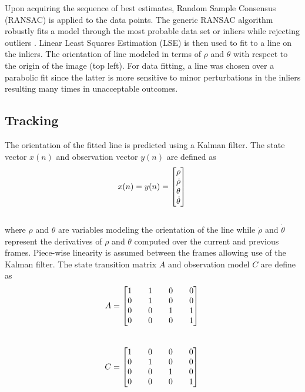 \documentclass{article}
\begin{document}
Upon acquiring the sequence of best estimates, Random Sample Consensus (RANSAC) is applied to the data points. The generic RANSAC algorithm robustly fits a model through the most probable data set or inliers while rejecting outliers \cite{hartley_multiple_2004,fischler_random_1981}. Linear Least Squares Estimation (LSE) is then used to fit to a line on the inliers. The orientation of line modeled in terms of $\rho$ and $\theta$ with respect to the origin of the image (top left). For data fitting, a line was chosen over a parabolic fit since the latter is more sensitive to minor perturbations in the inliers resulting many times in unacceptable outcomes.\\
\subsection{Tracking}
The orientation of the fitted line is predicted using a Kalman filter. The state vector $x(n)$ and observation vector $y(n)$ are defined as
\begin{equation}
x(n)= y(n)=\begin{bmatrix} \rho\\\dot{\rho}\\\theta\\\dot{\theta} \end{bmatrix}\\
\label{eq:state_measure_vectors}
\end{equation}\\
where $\rho$ and $\theta$ are variables modeling the orientation of the line while $\dot{\rho}$ and $\dot{\theta}$ represent the derivatives of $\rho$ and $\theta$ computed over the current and previous frames. Piece-wise linearity is assumed between the frames allowing use of the Kalman filter. The state transition matrix $A$ and observation model $C$ are define as
\begin{equation}
A = \begin{bmatrix} 1 && 1 && 0 && 0 \\ 0 && 1 && 0 && 0 \\ 0 && 0 && 1 && 1 \\ 0 && 0 && 0 && 1 \\\end{bmatrix}\\
\label{eq:state_trans}
\end{equation}\\
\begin{equation}
C = \begin{bmatrix} 1 && 0 && 0 && 0 \\ 0 && 1 && 0 && 0 \\ 0 && 0 && 1 && 0 \\ 0 && 0 && 0 && 1 \\\end{bmatrix}\\
\label{eq:observation_model}
\end{equation}\\
\end{document}
